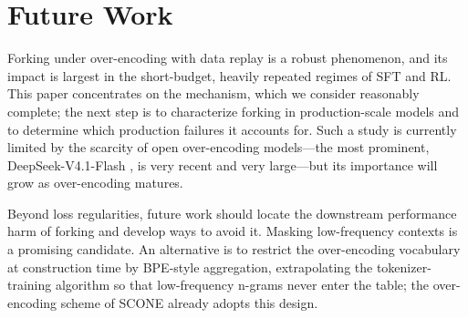 \section{Future Work}
\label{sec:discussion}

Forking under over-encoding with data replay is a robust phenomenon, and its impact is largest in the short-budget, heavily repeated regimes of SFT and RL. This paper concentrates on the mechanism, which we consider reasonably complete; the next step is to characterize forking in production-scale models and to determine which production failures it accounts for. Such a study is currently limited by the scarcity of open over-encoding models---the most prominent, DeepSeek-V4.1-Flash \citep{deepseek2026v41flash}, is very recent and very large---but its importance will grow as over-encoding matures.

Beyond loss regularities, future work should locate the downstream performance harm of forking and develop ways to avoid it. Masking low-frequency contexts is a promising candidate. An alternative is to restrict the over-encoding vocabulary at construction time by BPE-style aggregation, extrapolating the tokenizer-training algorithm so that low-frequency n-grams never enter the table; the over-encoding scheme of SCONE \citep{yu2025scone} already adopts this design.
